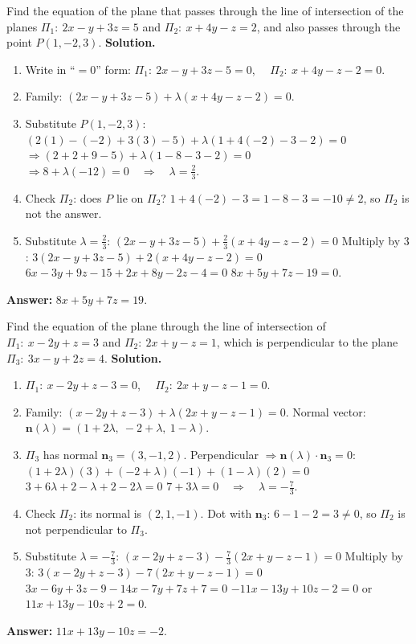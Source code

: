 \documentclass[11pt]{article}
\begin{document}
\begin{exoresolu}
Find the equation of the plane that passes through the line of intersection of the planes
$\Pi_1:\ 2x-y+3z=5$ and $\Pi_2:\ x+4y-z=2$, and also passes through the point $P(1,-2,3)$.
\tcblower
\textbf{Solution.}
\begin{enumerate}
\item Write in ``$=0$'' form:
$\Pi_1:\ 2x-y+3z-5=0$, $\quad \Pi_2:\ x+4y-z-2=0$.
\item Family: $(2x-y+3z-5)+\lambda(x+4y-z-2)=0$.
\item Substitute $P(1,-2,3)$:
$(2(1)-(-2)+3(3)-5)+\lambda(1+4(-2)-3-2)=0$
$\Rightarrow (2+2+9-5)+\lambda(1-8-3-2)=0$
$\Rightarrow 8 + \lambda(-12)=0 \quad\Rightarrow\quad \lambda=\frac{2}{3}$.
\item Check $\Pi_2$: does $P$ lie on $\Pi_2$? $1+4(-2)-3=1-8-3=-10\neq2$, so $\Pi_2$ is not the answer.
\item Substitute $\lambda=\frac{2}{3}$:
$(2x-y+3z-5)+\frac{2}{3}(x+4y-z-2)=0$
Multiply by $3$: $3(2x-y+3z-5)+2(x+4y-z-2)=0$
$6x-3y+9z-15+2x+8y-2z-4=0$
$8x+5y+7z-19=0$.
\end{enumerate}
\textbf{Answer:} $\boxed{8x+5y+7z=19}$.
\end{exoresolu}

\begin{exoresolu}
Find the equation of the plane through the line of intersection of
$\Pi_1:\ x-2y+z=3$ and $\Pi_2:\ 2x+y-z=1$, which is perpendicular to the plane $\Pi_3:\ 3x-y+2z=4$.
\tcblower
\textbf{Solution.}
\begin{enumerate}
\item $\Pi_1:\ x-2y+z-3=0$, $\quad \Pi_2:\ 2x+y-z-1=0$.
\item Family: $(x-2y+z-3)+\lambda(2x+y-z-1)=0$.
  Normal vector: $\mathbf{n}(\lambda) = (1+2\lambda,\ -2+\lambda,\ 1-\lambda)$.
\item $\Pi_3$ has normal $\mathbf{n}_3=(3,-1,2)$. Perpendicular $\Rightarrow \mathbf{n}(\lambda)\cdot\mathbf{n}_3=0$:
$(1+2\lambda)(3)+(-2+\lambda)(-1)+(1-\lambda)(2)=0$
$3+6\lambda+2-\lambda+2-2\lambda=0$
$7+3\lambda=0 \quad\Rightarrow\quad \lambda=-\frac{7}{3}$.
\item Check $\Pi_2$: its normal is $(2,1,-1)$. Dot with $\mathbf{n}_3$: $6-1-2=3\neq0$, so $\Pi_2$ is not perpendicular to $\Pi_3$.
\item Substitute $\lambda=-\frac{7}{3}$:
$(x-2y+z-3)-\frac{7}{3}(2x+y-z-1)=0$
Multiply by $3$: $3(x-2y+z-3)-7(2x+y-z-1)=0$
$3x-6y+3z-9-14x-7y+7z+7=0$
$-11x-13y+10z-2=0$ or $11x+13y-10z+2=0$.
\end{enumerate}
\textbf{Answer:} $\boxed{11x+13y-10z=-2}$.
\end{exoresolu}
\end{document}
